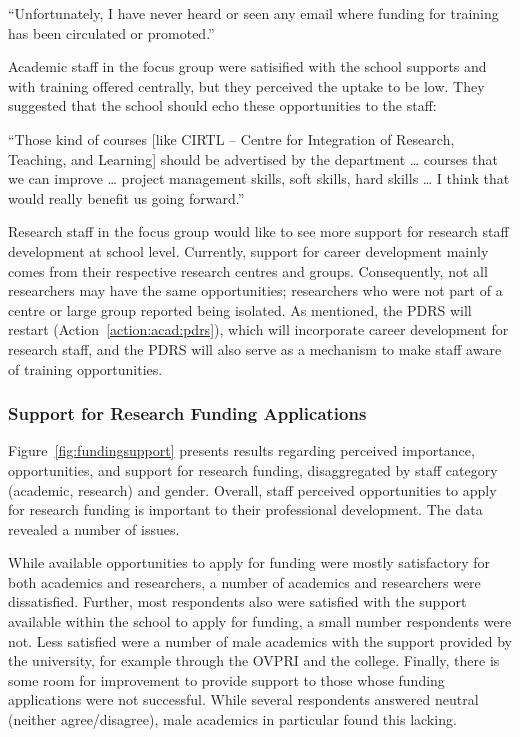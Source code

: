 \begin{myquote}
“Unfortunately, I have never heard or seen any email where funding for training has been circulated or promoted.''
\end{myquote}

Academic staff in the focus group were satisified with the school supports and with training offered centrally, but they perceived the uptake to be low. They suggested that the school should echo these opportunities to the staff:

\begin{myquote}
``Those kind of courses [like CIRTL – Centre for Integration of Research, Teaching, and Learning] should be advertised by the department … courses that we can improve … project management skills, soft skills, hard skills … I think that would really benefit us going forward.''
\end{myquote}

Research staff in the focus group would like to see more support for research staff development at school level. Currently, support for career development mainly comes from their respective research centres and groups. 
Consequently, not all researchers may have the same opportunities; researchers who were not part of a centre or large group reported being isolated. As mentioned, the PDRS will restart (Action~\ref{action:acad:pdrs}), which will incorporate career development for research staff, and the PDRS will also serve as a mechanism to make staff aware of training opportunities. 





\subsubsection{Support for Research Funding Applications}

Figure~\ref{fig:fundingsupport} presents results regarding perceived importance, opportunities, and support for research funding, disaggregated by staff category (academic, research) and gender. 
Overall, staff perceived opportunities to apply for research funding is important to their professional development.
The data revealed a number of issues.



While available opportunities to apply for funding were mostly satisfactory for both academics and researchers, a number of academics and researchers were dissatisfied. Further, most respondents also were satisfied with the support available within the school to apply for funding, a small number respondents were not. 
Less satisfied were a number of male academics with the support provided by the university, for example through the \ac{OVPRI} and the college. 
Finally, there is some room for improvement to provide support to those whose funding applications were not successful. While several respondents answered neutral (neither agree/disagree), male academics in particular found this lacking.









